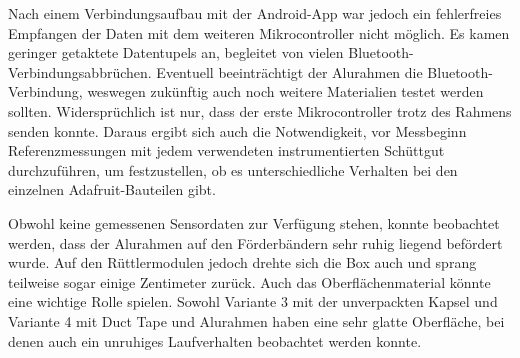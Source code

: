 Nach einem Verbindungsaufbau mit der Android-App war jedoch ein fehlerfreies Empfangen der Daten mit dem weiteren Mikrocontroller nicht möglich. Es kamen geringer getaktete Datentupels an, begleitet von vielen Bluetooth-Verbindungsabbrüchen. Eventuell beeinträchtigt der Alurahmen die Bluetooth-Verbindung, weswegen zukünftig auch noch weitere Materialien testet werden sollten. Widersprüchlich ist nur, dass der erste Mikrocontroller trotz des Rahmens senden konnte. Daraus ergibt sich auch die Notwendigkeit, vor Messbeginn Referenzmessungen mit jedem verwendeten instrumentierten Schüttgut durchzuführen, um festzustellen, ob es unterschiedliche Verhalten bei den einzelnen Adafruit-Bauteilen gibt.

Obwohl keine gemessenen Sensordaten zur Verfügung stehen, konnte beobachtet werden, dass der Alurahmen auf den Förderbändern sehr ruhig liegend befördert wurde. Auf den Rüttlermodulen jedoch drehte sich die Box auch und sprang teilweise sogar einige Zentimeter zurück. Auch das Oberflächenmaterial könnte eine wichtige Rolle spielen. Sowohl Variante 3 mit der unverpackten Kapsel und Variante 4 mit Duct Tape und Alurahmen haben eine sehr glatte Oberfläche, bei denen auch ein unruhiges Laufverhalten beobachtet werden konnte.
